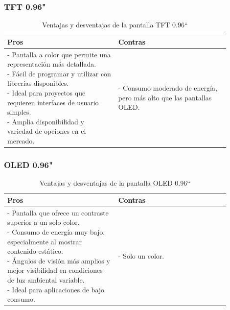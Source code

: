 \subsubsection{\gls{TFT} 0.96"}
\begin{table}[H]
\centering
\small
\begin{tabular}{|p{0.45\linewidth}|p{0.45\linewidth}|}
\hline
\textbf{Pros} &
\textbf{Contras} \\
\hline
\parbox[t]{\linewidth}{
\vspace{0.1cm}
- Pantalla a color que permite una representación más detallada. \medskip \\
- Fácil de programar y utilizar con librerías disponibles. \medskip \\
- Ideal para proyectos que requieren interfaces de usuario simples. \medskip \\
- Amplia disponibilidad y variedad de opciones en el mercado. \vspace{0.1cm}
} &
\parbox[t]{\linewidth}{
\vspace{0.1cm}
- Consumo moderado de energía, pero más alto que las pantallas \gls{OLED}. \medskip \\
\vspace{0.1cm}
} \\
\hline
\end{tabular}
\caption{Ventajas y desventajas de la pantalla TFT 0.96``}
\end{table}

\subsubsection{OLED 0.96"}
\begin{table}[H]
\centering
\small
\begin{tabular}{|p{0.45\linewidth}|p{0.45\linewidth}|}
\hline
\textbf{Pros} &
\textbf{Contras} \\
\hline
\parbox[t]{\linewidth}{
\vspace{0.1cm}
- Pantalla que ofrece un contraste superior a un solo color. \medskip \\
- Consumo de energía muy bajo, especialmente al mostrar contenido estático. \medskip \\
- Ángulos de visión más amplios y mejor visibilidad en condiciones de luz ambiental variable. \medskip \\
- Ideal para aplicaciones de bajo consumo. \medskip \\
\vspace{0.1cm}
} &
\parbox[t]{\linewidth}{
\vspace{0.1cm}
- Solo un color. \vspace{0.1cm}
} \\
\hline
\end{tabular}
\caption{Ventajas y desventajas de la pantalla OLED 0.96``}
\end{table}

